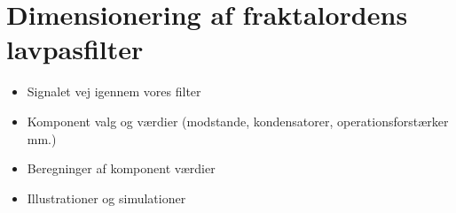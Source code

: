 \section{Dimensionering af fraktalordens lavpasfilter}
\label{DimensioneringAfFraktalordensLavpasfilter}
%
\begin{itemize}
  \item Signalet vej igennem vores filter
  \item Komponent valg og værdier (modstande, kondensatorer, operationsforstærker mm.) 
  \item Beregninger af komponent værdier
  \item Illustrationer og simulationer
\end{itemize}




